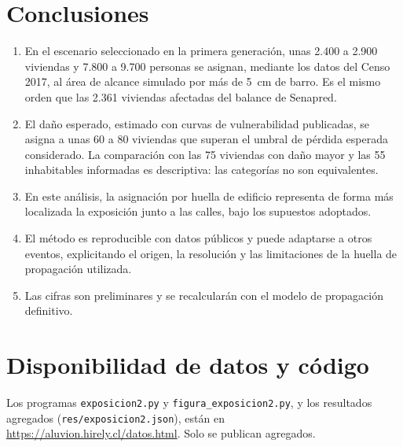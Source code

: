 \documentclass[10pt,a4paper]{article}
\begin{document}
\section{Conclusiones}
\begin{enumerate}
\item En el escenario seleccionado en la primera generación, unas 2.400 a 2.900 viviendas y 7.800 a 9.700 personas se asignan, mediante los datos del Censo 2017, al área de alcance simulado por más de \SI{5}{cm} de barro. Es el mismo orden que las 2.361 viviendas afectadas del balance de Senapred.
\item El daño esperado, estimado con curvas de vulnerabilidad publicadas, se asigna a unas 60 a 80 viviendas que superan el umbral de pérdida esperada considerado. La comparación con las 75 viviendas con daño mayor y las 55 inhabitables informadas es descriptiva: las categorías no son equivalentes.
\item En este análisis, la asignación por huella de edificio representa de forma más localizada la exposición junto a las calles, bajo los supuestos adoptados.
\item El método es reproducible con datos públicos y puede adaptarse a otros eventos, explicitando el origen, la resolución y las limitaciones de la huella de propagación utilizada.
\item Las cifras son preliminares y se recalcularán con el modelo de propagación definitivo.
\end{enumerate}

\section*{Disponibilidad de datos y código}
{\sloppy Los programas \texttt{exposicion2.py} y \texttt{figura\_exposicion2.py}, y los resultados agregados (\texttt{res/exposicion2.json}), están en \url{https://aluvion.hirely.cl/datos.html}\allowbreak. Solo se publican agregados.}



\end{document}

